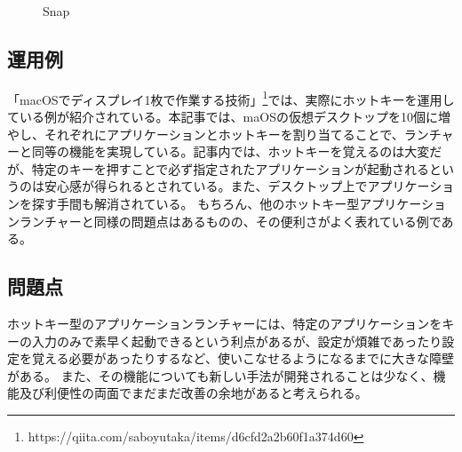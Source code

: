 \begin{figure}[h]
    \begin{center}
    \end{center}
    \caption{Snap}
    \label{fig:snap}
\end{figure}

\subsection{運用例}
「macOSでディスプレイ1枚で作業する技術」\footnote{https://qiita.com/saboyutaka/items/d6cfd2a2b60f1a374d60}では、実際にホットキーを運用している例が紹介されている。本記事では、maOSの仮想デスクトップを10個に増やし、それぞれにアプリケーションとホットキーを割り当てることで、ランチャーと同等の機能を実現している。記事内では、ホットキーを覚えるのは大変だが、特定のキーを押すことで必ず指定されたアプリケーションが起動されるというのは安心感が得られるとされている。また、デスクトップ上でアプリケーションを探す手間も解消されている。
もちろん、他のホットキー型アプリケーションランチャーと同様の問題点はあるものの、その便利さがよく表れている例である。

\subsection{問題点}
ホットキー型のアプリケーションランチャーには、特定のアプリケーションをキーの入力のみで素早く起動できるという利点があるが、設定が煩雑であったり設定を覚える必要があったりするなど、使いこなせるようになるまでに大きな障壁がある。
また、その機能についても新しい手法が開発されることは少なく、機能及び利便性の両面でまだまだ改善の余地があると考えられる。


